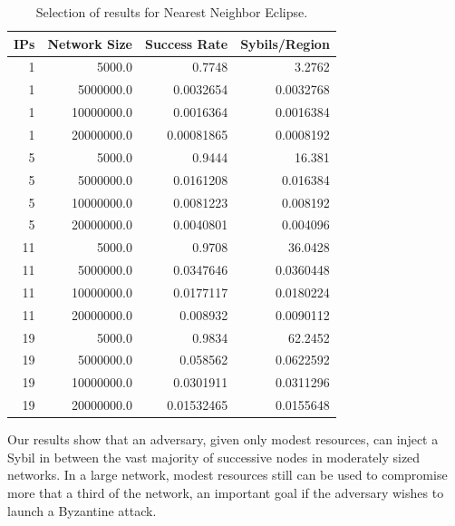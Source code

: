 \documentclass[11pt,conference]{IEEEtran}
\begin{document}
\begin{table}\small
	\centering
       \caption{Selection of results for Nearest Neighbor Eclipse.}  %
       \label{tab:exp2}
\begin{tabular}{|r|r|r|r|}
    \hline
    IPs & Network Size &  Success Rate & Sybils/Region \\ \hline
1 & 5000.0 & 0.7748 & 3.2762 \\ \hline
1 & 5000000.0 & 0.0032654 & 0.0032768 \\ \hline
1& 10000000.0 & 0.0016364 & 0.0016384 \\ \hline
1 & 20000000.0 & 0.00081865 & 0.0008192 \\ \hline
5 & 5000.0 & 0.9444 & 16.381 \\ \hline
5 & 5000000.0 & 0.0161208 & 0.016384 \\ \hline
5 & 10000000.0 & 0.0081223 & 0.008192 \\ \hline
5 & 20000000.0 & 0.0040801 & 0.004096 \\ \hline
11 & 5000.0 & 0.9708 & 36.0428 \\ \hline
11 & 5000000.0 & 0.0347646 & 0.0360448 \\ \hline
11 & 10000000.0 & 0.0177117 & 0.0180224 \\ \hline
11 & 20000000.0 & 0.008932 & 0.0090112 \\ \hline
19 & 5000.0 & 0.9834 & 62.2452 \\ \hline
19 & 5000000.0 & 0.058562 & 0.0622592 \\ \hline
19 & 10000000.0 & 0.0301911 & 0.0311296 \\ \hline
19 & 20000000.0 & 0.01532465 & 0.0155648 \\ \hline
\end{tabular}


\end{table}

Our results show that an adversary, given only modest resources, can inject a Sybil in between the vast majority of successive nodes in moderately sized networks.
In a large network, modest resources still can be used to compromise more that a third of the network, an  important goal if the adversary  wishes to launch a Byzantine attack.
\end{document}
